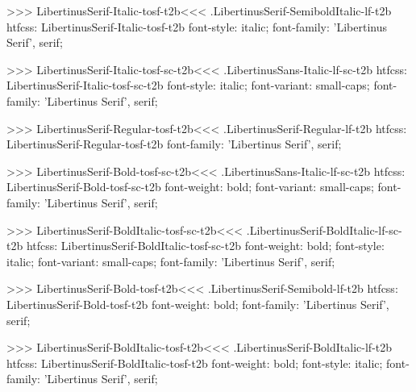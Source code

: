 {{{{{{{{{{>>>
\<LibertinusSerif-Italic-tosf-t2b\><<<
.LibertinusSerif-SemiboldItalic-lf-t2b
htfcss:  LibertinusSerif-Italic-tosf-t2b  font-style: italic; font-family: 'Libertinus Serif', serif;

>>>
\<LibertinusSerif-Italic-tosf-sc-t2b\><<<
.LibertinusSans-Italic-lf-sc-t2b
htfcss:  LibertinusSerif-Italic-tosf-sc-t2b  font-style: italic; font-variant: small-caps; font-family: 'Libertinus Serif', serif;

>>>
\<LibertinusSerif-Regular-tosf-t2b\><<<
.LibertinusSerif-Regular-lf-t2b
htfcss:  LibertinusSerif-Regular-tosf-t2b  font-family: 'Libertinus Serif', serif;

>>>
\<LibertinusSerif-Bold-tosf-sc-t2b\><<<
.LibertinusSans-Italic-lf-sc-t2b
htfcss:  LibertinusSerif-Bold-tosf-sc-t2b  font-weight: bold; font-variant: small-caps; font-family: 'Libertinus Serif', serif;

>>>
\<LibertinusSerif-BoldItalic-tosf-sc-t2b\><<<
.LibertinusSerif-BoldItalic-lf-sc-t2b
htfcss:  LibertinusSerif-BoldItalic-tosf-sc-t2b  font-weight: bold; font-style: italic; font-variant: small-caps; font-family: 'Libertinus Serif', serif;

>>>
\<LibertinusSerif-Bold-tosf-t2b\><<<
.LibertinusSerif-Semibold-lf-t2b
htfcss:  LibertinusSerif-Bold-tosf-t2b  font-weight: bold; font-family: 'Libertinus Serif', serif;

>>>
\<LibertinusSerif-BoldItalic-tosf-t2b\><<<
.LibertinusSerif-BoldItalic-lf-t2b
htfcss:  LibertinusSerif-BoldItalic-tosf-t2b  font-weight: bold; font-style: italic; font-family: 'Libertinus Serif', serif;

}}}}}}}}}}
